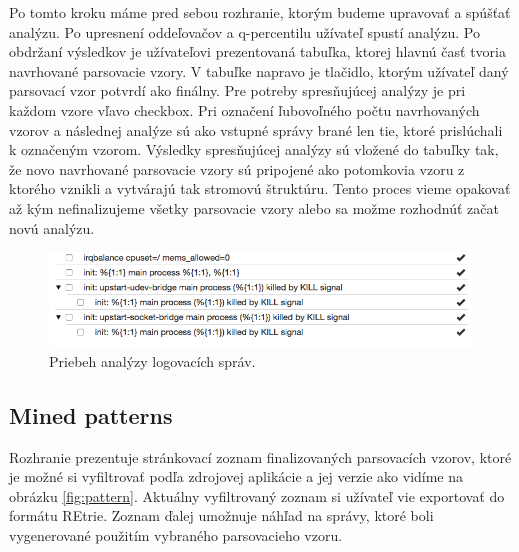 Po tomto kroku máme pred sebou rozhranie, ktorým budeme upravovať a spúšťať analýzu. Po upresnení oddeľovačov a q-percentilu užívateľ spustí analýzu. Po obdržaní výsledkov je užívateľovi prezentovaná tabuľka, ktorej hlavnú časť tvoria navrhované parsovacie vzory. V tabuľke napravo je tlačidlo, ktorým užívateľ daný parsovací vzor potvrdí ako finálny. Pre potreby spresňujúcej analýzy je pri každom vzore vľavo checkbox. Pri označení ľubovoľného počtu navrhovaných vzorov a následnej analýze sú ako vstupné správy brané len tie, ktoré prislúchali k označeným vzorom. Výsledky spresňujúcej analýzy sú vložené do tabuľky tak, že novo navrhované parsovacie vzory sú pripojené ako potomkovia vzoru z ktorého vznikli a vytvárajú tak stromovú štruktúru. Tento proces vieme opakovať až kým nefinalizujeme všetky parsovacie vzory alebo sa možme rozhodnúť začat novú analýzu.

\begin{figure}[htbp]
 \centering 
 \begin{minipage}{\linewidth}
 	\centering
 	\includegraphics[width=\textwidth]{Images/thesis-miner-analysis.png}	
 \end{minipage}
  \caption{Priebeh analýzy logovacích správ.}
  \label{fig:miner-source}
\end{figure}

\subsection{Mined patterns}
Rozhranie prezentuje stránkovací zoznam finalizovaných parsovacích vzorov, ktoré je možné si vyfiltrovať podľa zdrojovej aplikácie a jej verzie ako vidíme na obrázku \ref{fig:pattern}. Aktuálny vyfiltrovaný zoznam si užívateľ vie exportovať do formátu REtrie. Zoznam ďalej umožnuje náhľad na správy, ktoré boli vygenerované použitím vybraného parsovacieho vzoru. 

